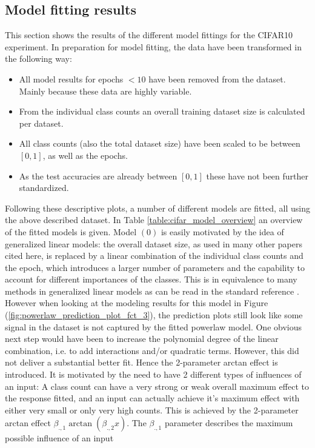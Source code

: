 \documentclass{article} %
\begin{document}
\subsection{Model fitting results}

This section shows the results of the different model fittings for the CIFAR10 experiment. In preparation for model fitting, the data have been transformed in the following way:
\begin{itemize}
    \item All model results for epochs $< 10$ have been removed from the dataset. Mainly because these data are highly variable.
    \item From the individual class counts an overall training dataset size is calculated per dataset.
    \item All class counts (also the total dataset size) have been scaled to be between $[0, 1]$, as well as the epochs.
    \item As the test accuracies are already between $[0,1]$ these have not been further standardized.
\end{itemize}
Following these descriptive plots, a number of different models are fitted, all using the above described dataset.
In Table \ref{table:cifar_model_overview} an overview of the fitted models is given.
Model $(0)$ is easily motivated by the idea of generalized linear models: the overall dataset size, as used in many other papers cited here, is replaced by a linear combination of the individual class counts and the epoch, which introduces a larger number of parameters and the capability to account for different importances of the classes. 
This is in equivalence to many methods in generalized linear models as can be read in the standard reference \cite{GeneralizedLinearModels}.
However when looking at the modeling results for this model in Figure (\ref{fig:powerlaw_prediction_plot_fct_3}), the prediction plots still look like some signal in the dataset is not captured by the fitted powerlaw model.
One obvious next step would have been to increase the polynomial degree of the linear combination, i.e. to add interactions and/or quadratic terms. However, this did not deliver a substantial better fit.
Hence the 2-parameter arctan effect is introduced. It is motivated by the need to have 2 different types of influences of an input: 
A class count can have a very strong or weak overall maximum effect to the response fitted, and an input can actually achieve it's maximum effect with either very small or only very high counts.
This is achieved by the 2-parameter arctan effect $\beta_{., 1} \arctan{(\beta_{., 2} x)}$. The $\beta_{.,1}$ parameter describes the maximum possible influence of an input 
\end{document}
